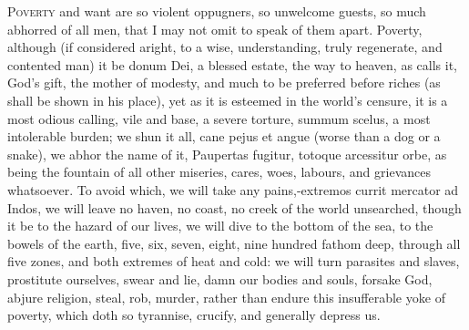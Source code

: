 {\lettrine{P}{overty} and want are so violent oppugners, so unwelcome guests, so much
abhorred of all men, that I may not omit to speak of them apart.
Poverty, although (if considered aright, to a wise, understanding,
truly regenerate, and contented man) it be donum Dei, a blessed estate,
the way to heaven, as \Chrysostom{} calls it, God's gift, the mother
of modesty, and much to be preferred before riches (as shall be shown
in his place), yet as it is esteemed in the world's censure, it
is a most odious calling, vile and base, a severe torture, summum
scelus, a most intolerable burden; we shun it all, cane pejus et
angue (worse than a dog or a snake), we abhor the name of it,
Paupertas fugitur, totoque arcessitur orbe, as being the fountain
of all other miseries, cares, woes, labours, and grievances whatsoever.
To avoid which, we will take any pains,-extremos currit mercator ad
Indos, we will leave no haven, no coast, no creek of the world
unsearched, though it be to the hazard of our lives, we will dive to
the bottom of the sea, to the bowels of the earth, five, six,
seven, eight, nine hundred fathom deep, through all five zones, and
both extremes of heat and cold: we will turn parasites and slaves,
prostitute ourselves, swear and lie, damn our bodies and souls, forsake
God, abjure religion, steal, rob, murder, rather than endure this
insufferable yoke of poverty, which doth so tyrannise, crucify, and
generally depress us.

}
